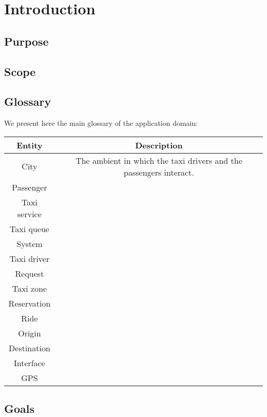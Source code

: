 \chapter{Introduction}

\section{Purpose}
\section{Scope}
\section{Glossary}
We present here the main glossary of the application domain:
\begin{center}
\begin{tabular}{|c|c|} \hline
\textbf{Entity} & \textbf{Description} \\ \hline
City & The ambient in which the taxi drivers and the passengers interact. \\ \hline
Passenger & \\ \hline
Taxi service & \\ \hline
Taxi queue & \\ \hline
System & \\ \hline
Taxi driver & \\ \hline
Request & \\ \hline
Taxi zone & \\ \hline
Reservation & \\ \hline
Ride & \\ \hline
Origin & \\ \hline
Destination & \\ \hline
Interface & \\ \hline
GPS & \\ \hline
\end{tabular}
\end{center}

\section{Goals}